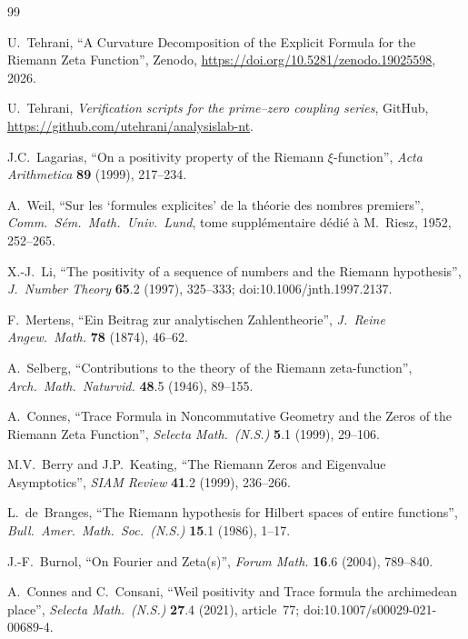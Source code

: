 \documentclass[11pt]{article}
\begin{document}
\newpage
\begin{thebibliography}{99}

U.~Tehrani,
``A Curvature Decomposition of the Explicit Formula
for the Riemann Zeta Function'',
Zenodo, \url{https://doi.org/10.5281/zenodo.19025598}, 2026.

U.~Tehrani,
\emph{Verification scripts for the prime--zero coupling series},
GitHub, \url{https://github.com/utehrani/analysislab-nt}.

J.C.~Lagarias,
``On a positivity property of the Riemann $\xi$-function'',
\emph{Acta Arithmetica} \textbf{89} (1999), 217--234.

A.~Weil,
``Sur les `formules explicites' de la th\'eorie des nombres
premiers'',
\emph{Comm.\ S\'em.\ Math.\ Univ.\ Lund},
tome suppl\'ementaire d\'edi\'e \`a M.~Riesz, 1952,
252--265.

X.-J.~Li,
``The positivity of a sequence of numbers and the Riemann
hypothesis'',
\emph{J.\ Number Theory} \textbf{65}.2 (1997), 325--333;
doi:10.1006/jnth.1997.2137.

F.~Mertens,
``Ein Beitrag zur analytischen Zahlentheorie'',
\emph{J.\ Reine Angew.\ Math.} \textbf{78} (1874), 46--62.

A.~Selberg,
``Contributions to the theory of the Riemann zeta-function'',
\emph{Arch.\ Math.\ Naturvid.} \textbf{48}.5 (1946), 89--155.

A.~Connes,
``Trace Formula in Noncommutative Geometry and the Zeros of the
Riemann Zeta Function'',
\emph{Selecta Math.\ (N.S.)} \textbf{5}.1 (1999), 29--106.

M.V.~Berry and J.P.~Keating,
``The Riemann Zeros and Eigenvalue Asymptotics'',
\emph{SIAM Review} \textbf{41}.2 (1999), 236--266.

L.~de~Branges,
``The Riemann hypothesis for Hilbert spaces of entire functions'',
\emph{Bull.\ Amer.\ Math.\ Soc.\ (N.S.)} \textbf{15}.1 (1986),
1--17.

J.-F.~Burnol,
``On Fourier and Zeta(s)'',
\emph{Forum Math.} \textbf{16}.6 (2004), 789--840.

A.~Connes and C.~Consani,
``Weil positivity and Trace formula the archimedean place'',
\emph{Selecta Math.\ (N.S.)} \textbf{27}.4 (2021), article~77;
doi:10.1007/s00029-021-00689-4.


\end{thebibliography}
\end{document}
